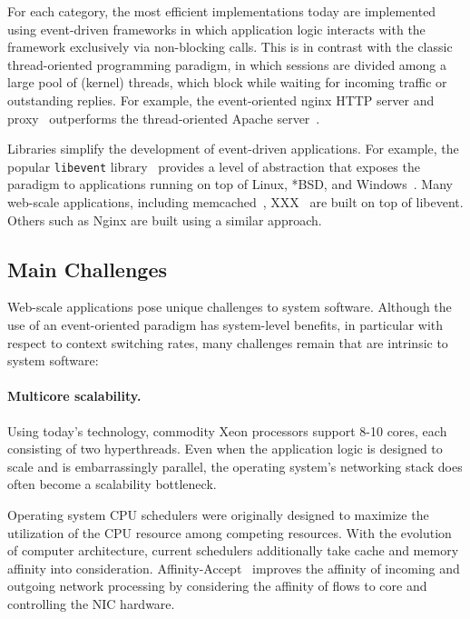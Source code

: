 For each category, the most efficient implementations today are
implemented using event-driven frameworks in which application logic
interacts with the framework exclusively via non-blocking calls.  This
is in contrast with the classic thread-oriented programming paradigm,
in which sessions are divided among a large pool of (kernel)
threads, which block while waiting for incoming traffic or outstanding
replies.  For example, the event-oriented nginx HTTP
server and proxy~\cite{reese2008nginx} outperforms the thread-oriented Apache server~\cite{misc:apache}.

Libraries simplify the development of event-driven applications.  For
example, the popular \texttt{libevent} library~\cite{misc:libevent} provides a level of
abstraction that exposes the paradigm to applications running on top
of Linux, *BSD, and Windows~\cite{missing}.  Many web-scale
applications, including memcached~\cite{missing}, XXX~\cite{missing} are built on top
of libevent.  Others such as Nginx are built using a similar approach.


\subsection{Main Challenges}
\label{sec:motivation:challenges}

Web-scale applications pose unique challenges to system software.
Although the use of an event-oriented paradigm has system-level
benefits, in particular with respect to context switching rates, many
challenges remain that are intrinsic to system software:

\paragraph{Multicore scalability.}

Using today's technology, commodity Xeon processors support 8-10
cores, each consisting of two hyperthreads.  Even when the application
logic is designed to scale and is embarrassingly parallel, the
operating system's networking stack does often become a scalability
bottleneck.

Operating system CPU schedulers were originally designed to
maximize the utilization of the CPU resource among competing
resources.  With the evolution of computer architecture, current
schedulers additionally take cache and memory affinity into
consideration.  Affinity-Accept~\cite{DBLP:conf/eurosys/PesterevSZM12}
improves the affinity of incoming and outgoing network processing by
considering the affinity of flows to core and controlling the NIC
hardware.

